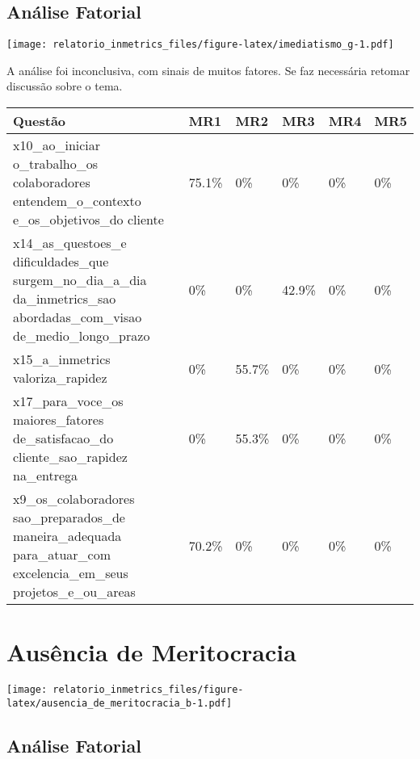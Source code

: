 \documentclass[]{book}
\begin{document}
\hypertarget{analise-fatorial-4}{%
\subsection{Análise Fatorial}\label{analise-fatorial-4}}

\texttt{[image: relatorio\_inmetrics\_files/figure-latex/imediatismo\_g-1.pdf]}

A análise foi inconclusiva, com sinais de muitos fatores. Se faz necessária retomar discussão sobre o tema.

\begin{table}[H]
\centering\begingroup\fontsize{12}{14}\selectfont

\begin{tabular}{>{\raggedright\arraybackslash}p{20em}lllll}
\toprule
Questão & MR1 & MR2 & MR3 & MR4 & MR5\\
\midrule
x10\_ao\_iniciar
o\_trabalho\_os
colaboradores
entendem\_o\_contexto
e\_os\_objetivos\_do
cliente & 75.1\% & 0\% & 0\% & 0\% & 0\%\\
x14\_as\_questoes\_e
dificuldades\_que
surgem\_no\_dia\_a\_dia
da\_inmetrics\_sao
abordadas\_com\_visao
de\_medio\_longo\_prazo & 0\% & 0\% & 42.9\% & 0\% & 0\%\\
x15\_a\_inmetrics
valoriza\_rapidez & 0\% & 55.7\% & 0\% & 0\% & 0\%\\
x17\_para\_voce\_os
maiores\_fatores
de\_satisfacao\_do
cliente\_sao\_rapidez
na\_entrega & 0\% & 55.3\% & 0\% & 0\% & 0\%\\
x9\_os\_colaboradores
sao\_preparados\_de
maneira\_adequada
para\_atuar\_com
excelencia\_em\_seus
projetos\_e\_ou\_areas & 70.2\% & 0\% & 0\% & 0\% & 0\%\\
\bottomrule
\end{tabular}
\endgroup{}
\end{table}

\hypertarget{ausencia-de-meritocracia}{%
\section{Ausência de Meritocracia}\label{ausencia-de-meritocracia}}

\texttt{[image: relatorio\_inmetrics\_files/figure-latex/ausencia\_de\_meritocracia\_b-1.pdf]}

\hypertarget{analise-fatorial-5}{%
\subsection{Análise Fatorial}\label{analise-fatorial-5}}
\end{document}
